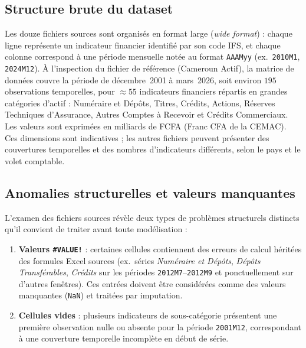 \documentclass[12pt, a4paper]{article}
\begin{document}
\subsection{Structure brute du dataset}
\label{subsec:structure_brute}

Les douze fichiers sources sont organisés en format large
(\textit{wide format}) : chaque ligne représente un indicateur financier
identifié par son code IFS, et chaque colonne correspond à une période
mensuelle notée au format \texttt{AAAMyy}
(ex.\ \texttt{2010M1}, \texttt{2024M12}).
À l'inspection du fichier de référence (Cameroun Actif), la matrice de données
couvre la période de décembre~2001 à mars~2026, soit environ $195$
observations temporelles, pour $\approx 55$ indicateurs financiers répartis
en grandes catégories d'actif : Numéraire et Dépôts, Titres, Crédits, Actions,
Réserves Techniques d'Assurance, Autres Comptes à Recevoir et Crédits
Commerciaux. Les valeurs sont exprimées en milliards de FCFA
(Franc CFA de la CEMAC). Ces dimensions sont indicatives ; les autres fichiers
peuvent présenter des couvertures temporelles et des nombres d'indicateurs
différents, selon le pays et le volet comptable.

\subsection{Anomalies structurelles et valeurs manquantes}
\label{subsec:anomalies_struct}

L'examen des fichiers sources révèle deux types de problèmes structurels
distincts qu'il convient de traiter avant toute modélisation :

\begin{enumerate}
    \item \textbf{Valeurs \texttt{\#VALUE!}} : certaines cellules contiennent
    des erreurs de calcul héritées des formules Excel sources
    (ex.\ séries \textit{Numéraire et Dépôts}, \textit{Dépôts Transférables},
    \textit{Crédits} sur les périodes \texttt{2012M7}--\texttt{2012M9} et
    ponctuellement sur d'autres fenêtres). Ces entrées doivent être
    considérées comme des valeurs manquantes (\texttt{NaN}) et traitées
    par imputation.

    \item \textbf{Cellules vides} : plusieurs indicateurs de sous-catégorie
    présentent une première observation nulle ou absente pour la période
    \texttt{2001M12}, correspondant à une couverture temporelle incomplète
    en début de série.
\end{enumerate}
\end{document}
